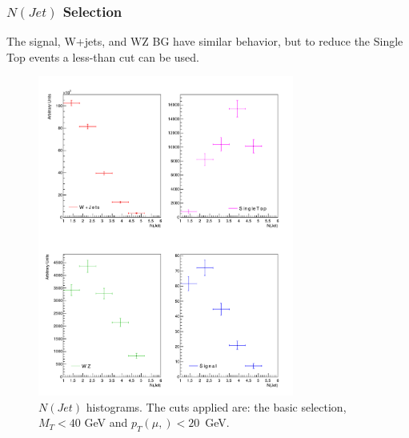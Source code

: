 \documentclass{beamer}
\begin{document}
\begin{frame}
\frametitle{$N(Jet)$ Selection}
\begin{justify}
{\scriptsize The signal, W+jets, and WZ BG have similar behavior, but to reduce the Single Top events a less-than cut can be used.}
\end{justify}

\begin{figure}[!h]

\centering
\includegraphics[width=0.75\textwidth, height=0.65\textheight]{pictures/Selection/NJet/All-NJet}
\caption{{\scriptsize $N(Jet)$ histograms. The cuts applied are: the basic selection, $M_T<40$ GeV and $p_T(\mu,)<20$~GeV.}}
\label{All-NJet}

\end{figure}


\end{frame}

\end{document}
